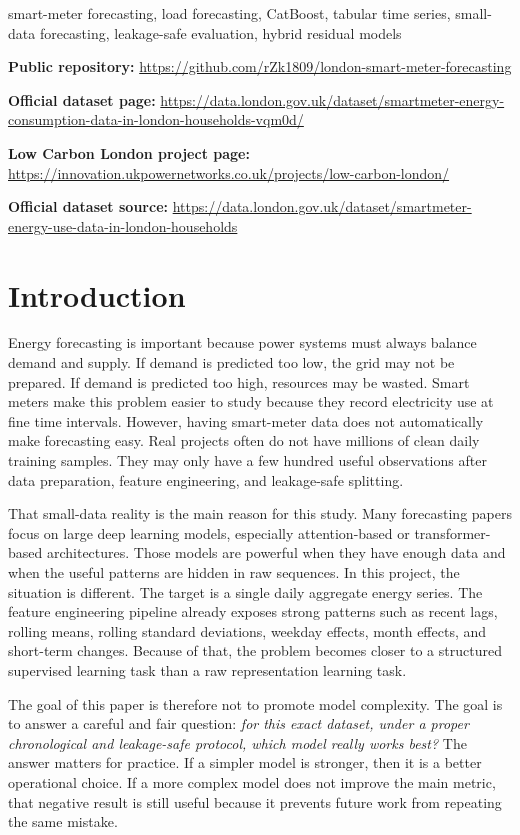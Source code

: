 \documentclass[conference]{IEEEtran}
\begin{document}
\begin{IEEEkeywords}
smart-meter forecasting, load forecasting, CatBoost, tabular time series, small-data forecasting, leakage-safe evaluation, hybrid residual models
\end{IEEEkeywords}

\noindent\textbf{Public repository:} \url{https://github.com/rZk1809/london-smart-meter-forecasting}

\noindent\textbf{Official dataset page:} \url{https://data.london.gov.uk/dataset/smartmeter-energy-consumption-data-in-london-households-vqm0d/}

\noindent\textbf{Low Carbon London project page:} \url{https://innovation.ukpowernetworks.co.uk/projects/low-carbon-london/}

\noindent\textbf{Official dataset source:} \url{https://data.london.gov.uk/dataset/smartmeter-energy-use-data-in-london-households}

\section{Introduction}
Energy forecasting is important because power systems must always balance demand and supply. If demand is predicted too low, the grid may not be prepared. If demand is predicted too high, resources may be wasted. Smart meters make this problem easier to study because they record electricity use at fine time intervals. However, having smart-meter data does not automatically make forecasting easy. Real projects often do not have millions of clean daily training samples. They may only have a few hundred useful observations after data preparation, feature engineering, and leakage-safe splitting.

That small-data reality is the main reason for this study. Many forecasting papers focus on large deep learning models, especially attention-based or transformer-based architectures. Those models are powerful when they have enough data and when the useful patterns are hidden in raw sequences. In this project, the situation is different. The target is a single daily aggregate energy series. The feature engineering pipeline already exposes strong patterns such as recent lags, rolling means, rolling standard deviations, weekday effects, month effects, and short-term changes. Because of that, the problem becomes closer to a structured supervised learning task than a raw representation learning task.

The goal of this paper is therefore not to promote model complexity. The goal is to answer a careful and fair question: \emph{for this exact dataset, under a proper chronological and leakage-safe protocol, which model really works best?} The answer matters for practice. If a simpler model is stronger, then it is a better operational choice. If a more complex model does not improve the main metric, that negative result is still useful because it prevents future work from repeating the same mistake.
\end{document}
